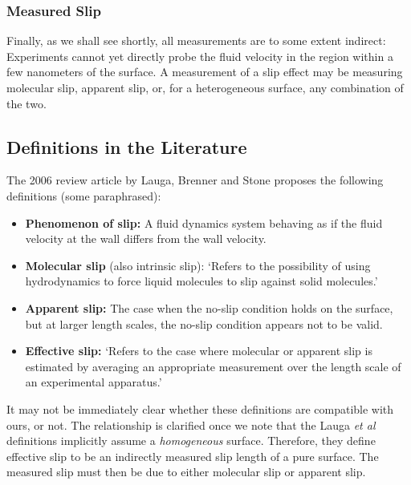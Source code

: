 \documentclass[12pt, a4paper, twoside, openright]{book}
\begin{document}
\subsubsection*{Measured Slip}

Finally, as we shall see shortly, all measurements are to some extent indirect: Experiments cannot yet directly probe the fluid velocity in the region within a few nanometers of the surface. A measurement of a slip effect may be measuring molecular slip, apparent slip, or, for a heterogeneous surface, any combination of the two.


\clearpage
\subsection*{Definitions in the Literature}

The 2006 review article by Lauga, Brenner and Stone \cite{LaugaReview2006} proposes the following definitions (some paraphrased):

\begin{itemize}

\item \textbf{Phenomenon of slip:} A fluid dynamics system behaving as if the fluid velocity at the wall differs from the wall velocity.

\item \textbf{Molecular slip} (also intrinsic slip): `Refers to the possibility of using hydrodynamics to force liquid molecules to slip against solid molecules.'

\item \textbf{Apparent slip:} The case when the no-slip condition holds on the surface, but at larger length scales, the no-slip condition appears not to be valid.

\item \textbf{Effective slip:} `Refers to the case where molecular or apparent slip is estimated by averaging an appropriate measurement over the length scale of an experimental apparatus.'

\end{itemize}

It may not be immediately clear whether these definitions are compatible with ours, or not. The relationship is clarified once we note that the Lauga \emph{et al} definitions implicitly assume a \emph{homogeneous} surface. Therefore, they define effective slip to be an indirectly measured slip length of a pure surface. The measured slip must then be due to either molecular slip or apparent slip.
\end{document}
